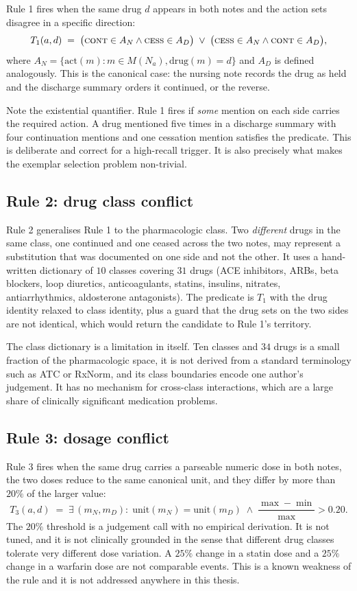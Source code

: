 Rule 1 fires when the same drug $d$ appears in both notes and the action sets
disagree in a specific direction:
\[
T_1(a,d) \;=\;
\bigl(\textsc{cont} \in A_N \wedge \textsc{cess} \in A_D\bigr)
\;\vee\;
\bigl(\textsc{cess} \in A_N \wedge \textsc{cont} \in A_D\bigr),
\]
where $A_N = \{\mathrm{act}(m) : m \in M(N_a), \mathrm{drug}(m) = d\}$ and $A_D$
is defined analogously. This is the canonical case: the nursing note records the
drug as held and the discharge summary orders it continued, or the reverse.

Note the existential quantifier. Rule 1 fires if \emph{some} mention on each
side carries the required action. A drug mentioned five times in a discharge
summary with four continuation mentions and one cessation mention satisfies the
predicate. This is deliberate and correct for a high-recall trigger. It is also
precisely what makes the exemplar selection problem non-trivial.

\subsection{Rule 2: drug class conflict}

Rule 2 generalises Rule 1 to the pharmacologic class. Two \emph{different} drugs
in the same class, one continued and one ceased across the two notes, may
represent a substitution that was documented on one side and not the other. It
uses a hand-written dictionary of $10$ classes covering $31$ drugs
(ACE inhibitors, ARBs, beta blockers, loop diuretics, anticoagulants, statins,
insulins, nitrates, antiarrhythmics, aldosterone antagonists). The predicate is
$T_1$ with the drug identity relaxed to class identity, plus a guard that the
drug sets on the two sides are not identical, which would return the candidate
to Rule 1's territory.

The class dictionary is a limitation in itself. Ten classes and $34$ drugs is a
small fraction of the pharmacologic space, it is not derived from a standard
terminology such as ATC or RxNorm, and its class boundaries encode one author's
judgement. It has no mechanism for cross-class interactions, which are a large
share of clinically significant medication problems.

\subsection{Rule 3: dosage conflict}

Rule 3 fires when the same drug carries a parseable numeric dose in both notes,
the two doses reduce to the same canonical unit, and they differ by more than
$20\%$ of the larger value:
\[
T_3(a,d) \;=\; \exists\, (m_N, m_D) :\;
\mathrm{unit}(m_N) = \mathrm{unit}(m_D)
\;\wedge\;
\frac{\max - \min}{\max} > 0.20 .
\]
The $20\%$ threshold is a judgement call with no empirical derivation. It is not
tuned, and it is not clinically grounded in the sense that different drug
classes tolerate very different dose variation. A $25\%$ change in a statin dose
and a $25\%$ change in a warfarin dose are not comparable events. This is a
known weakness of the rule and it is not addressed anywhere in this thesis.

